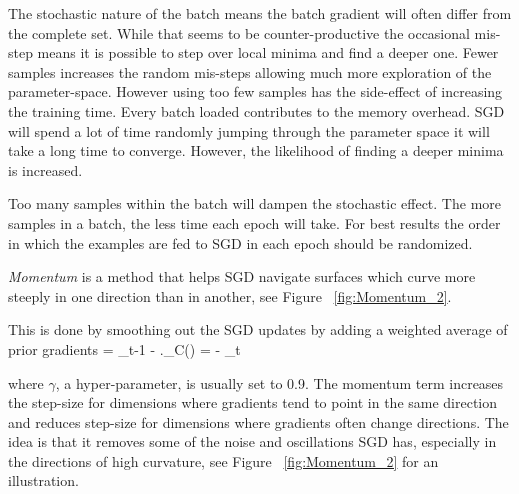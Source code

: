 The stochastic nature of the batch means the batch gradient will often differ from the complete set.
While that seems to be counter-productive the occasional mis-step means it is possible to step over local minima and find a deeper one.
Fewer samples increases the random mis-steps allowing much more exploration of the parameter-space.
However using too few samples has the side-effect of increasing the training time.
Every batch loaded contributes to the memory overhead.
SGD will spend a lot of time randomly jumping through the parameter space it will take a long time to converge.
However, the likelihood of finding a deeper minima is increased.

Too many samples within the batch will dampen the stochastic effect.
The more samples in a batch, the less time each epoch will take.
For best results the order in which the examples are fed to SGD in each epoch should be randomized\citep{lecun2012efficient}.

\textit{Momentum} is a method that helps SGD navigate surfaces which curve more steeply in one direction than in another, see Figure ~\ref{fig:Momentum_2}\citep{bengio2012practical}\citep{werbos1990backpropagation}.

This is done by smoothing out the SGD updates by adding a weighted average of prior gradients
\be
\mu = \gamma \mu_{t-1} - \eta.\Delta_\theta C(\theta)
\ee
\be
\theta = \theta - \mu_t
\ee

where $\gamma$, a hyper-parameter, is usually set to 0.9.
The momentum term increases the step-size for dimensions where gradients tend to point in the same direction and reduces step-size for dimensions where gradients often change directions.
The idea is that it removes some of the noise and oscillations SGD has, especially in the directions of high curvature, see Figure ~\ref{fig:Momentum_2} for an illustration.

